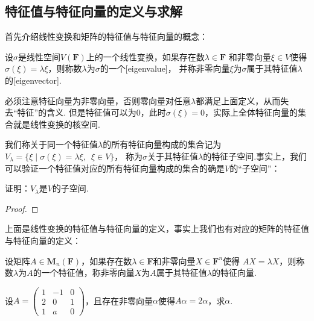 \subsection{特征值与特征向量的定义与求解}
首先介绍线性变换和矩阵的特征值与特征向量的概念：
\begin{definition}
    设$\sigma$是线性空间$V(\mathbf{F})$上的一个线性变换，如果存在数$\lambda\in\mathbf{F}$
    和非零向量$\xi\in V$使得$\sigma(\xi)=\lambda\xi$，则称数$\lambda$为$\sigma$的一个[eigenvalue]，
    并称非零向量$\xi$为$\sigma$属于其特征值$\lambda$的[eigenvector].
\end{definition}
必须注意特征向量为非零向量，否则零向量对任意$\lambda$都满足上面定义，从而失去``特征''的含义.
但是特征值可以为0，此时$\sigma(\xi)=0$，实际上全体特征向量的集合就是线性变换的核空间.

我们称关于同一个特征值$\lambda$的所有特征向量构成的集合记为$V_\lambda=\{\xi \mid \sigma(\xi)=\lambda\xi,\enspace\xi\in V\}$，
称为$\sigma$关于其特征值$\lambda$的特征子空间.事实上，我们可以验证一个特征值对应的所有特征向量构成的集合的确是$V$的``子空间''：
\begin{example}
    证明：$V_\lambda$是$V$的子空间.
\end{example}
\begin{proof}

\end{proof}

上面是线性变换的特征值与特征向量的定义，事实上我们也有对应的矩阵的特征值与特征向量的定义：
\begin{definition}
    设矩阵$A\in \mathbf{M}_n(\mathbf{F})$，如果存在数$\lambda\in\mathbf{F}$和非零向量$X\in\mathbf{F}^n$使得
    $AX=\lambda X$，则称数$\lambda$为$A$的一个特征值，称非零向量$X$为$A$属于其特征值$\lambda$的特征向量.
\end{definition}
\begin{example}
    设$A=\begin{pmatrix}
        1 & -1 & 0 \\ 2 & 0 & 1 \\ 1 & a & 0
    \end{pmatrix}$，且存在非零向量$\alpha$使得$A\alpha=2\alpha$，求$\alpha$.
\end{example}
\begin{solution}

\end{solution}

